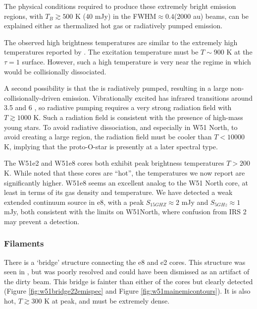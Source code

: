 The physical conditions required to produce these extremely bright emission
regions, with $T_B \gtrsim 500$ K (40 mJy) in the FWHM$\approx0.4$\arcsec (2000
au) beams, can be explained either as thermalized hot gas or radiatively pumped
emission.

The observed high brightness temperatures are similar to the extremely high
temperatures reported by \citet{Zapata2010a}.  The excitation temperature must
be $T\sim900$ K at the \formaldehyde \twotwo $\tau=1$ surface.  However, such a
high temperature is very near the regime in which \formaldehyde would be
collisionally dissociated.

A second possibility is that the \formaldehyde is radiatively pumped, resulting
in a large non-collisionally-driven emission.  Vibrationally excited
\formaldehyde has infrared
transitions around 3.5 and 6 \um \citep{Al-Refaie2015a}, so radiative pumping
requires a very strong radiation field with $T\gtrsim1000$ K.  Such a radiation
field is consistent with the presence of high-mass young stars.  To avoid
radiative dissociation, and especially in W51 North, to avoid creating a large
\hii region, the radiation field must be cooler than $T < 10000$ K,
implying that the proto-O-star \citep[as inferred from its luminosity and its
kinematically-derived mass][]{Zapata2008a,Zapata2009a} is presently at a later
spectral type.



The W51e2 and W51e8 cores both exhibit peak brightness temperatures $T>200$ K.
While \citet{Zhang1997a} noted that these cores are ``hot'', the temperatures
we now report are significantly higher.  W51e8 seems an excellent analog to the
W51 North core, at least in terms of its gas density and temperature.  We have
detected a weak extended continuum source in e8, with a peak $S_{15 GHZ}
\approx 2$ mJy and $S_{5 GHz} \approx 1$ mJy, both consistent with the limits
on W51North, where confusion from IRS 2 may prevent a detection.

\subsubsection{Filaments}
There is a `bridge' structure connecting the e8 and e2 cores.  This structure
was seen in \citet{Zhang1997a}, but was poorly resolved and could have been
dismissed as an artifact of the dirty beam.  This bridge is fainter than either
of the cores but clearly detected (Figure \ref{fig:w51bridge22emispec} and
Figure \ref{fig:w51mainemicontours}).  It is also hot, $T\gtrsim300$ K at peak,
and must be extremely dense.


